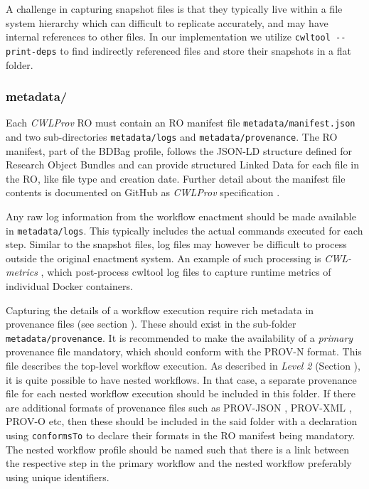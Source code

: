 \documentclass[a4paper,num-refs]{oup-contemporary}
\begin{document}
A challenge in capturing snapshot files is that they typically live within a file system hierarchy which can difficult to replicate accurately, and may have internal references to other files. In our implementation we utilize \texttt{cwltool -{}-print-deps} to find indirectly referenced files and store their snapshots in a flat folder.

\subsubsection{\textcolor{black}metadata/}
Each \textit{CWLProv} RO must contain an RO manifest file  \texttt{metadata/manifest.json} and two sub-directories \texttt{metadata/logs} and \texttt{metadata/provenance}. The RO manifest, part of the BDBag \citep{chard_2016} profile, follows the JSON-LD structure defined for Research Object Bundles \citep{RObundle}  and can provide structured Linked Data for each file in the RO, like file type and creation date. Further detail about the manifest file contents is documented on GitHub as \textit{CWLProv} specification \citep{cwlprov}. 

Any raw log information from the workflow enactment should be made available in \texttt{metadata/logs}. This typically includes the actual commands executed for each step. Similar to the snapshot files, log files may however be difficult to process outside the original enactment system. An example of such processing is \emph{CWL-metrics} \citep{10.1093/gigascience/giz052}, which post-process cwltool log files to capture runtime metrics of individual Docker containers.

Capturing the details of a workflow execution require rich metadata in provenance files (see section \textbf{}). These should exist in the sub-folder \texttt{metadata/provenance}. It is recommended to make the availability of a \textit{primary} provenance file mandatory, which should conform with the PROV-N \citep{moreau_2013} format. This file describes the top-level workflow execution. As described in \textit{Level 2} (Section \textbf{}), it is quite possible to have nested workflows. In that case, a separate provenance file for each nested workflow execution should be included in this folder. If there are additional formats of provenance files such as PROV-JSON \citep{huynh_2013}, PROV-XML \citep{PROVXML}, PROV-O \citep{PROVO} etc, then these should be included in the said folder with a declaration using \texttt{conformsTo} to declare their formats in the RO manifest being mandatory. The nested workflow profile should be named such that there is a link between the respective step in the primary workflow and the nested workflow preferably using unique identifiers. 
\end{document}
